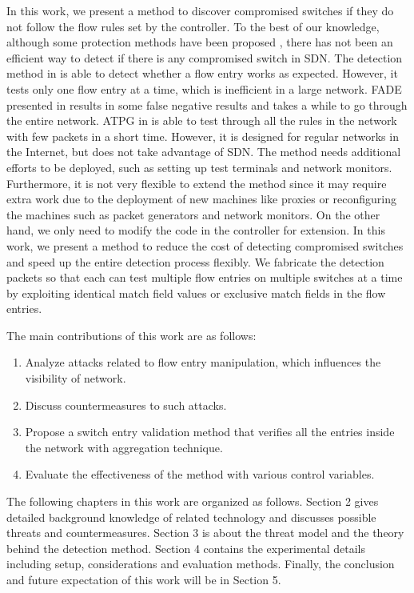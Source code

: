 \documentclass[conference]{IEEEtran}
\begin{document}
In this work, we present a method to discover compromised switches if they do not follow the flow rules set by the controller. To the best of our knowledge, although some protection methods have been proposed \cite{CKGL15,PJL16}, there has not been an efficient way to detect if there is any compromised switch in SDN. The detection method in \cite{CKGL15} is able to detect whether a flow entry works as expected. However, it tests only one flow entry at a time, which is inefficient in a large network. FADE presented in \cite{PJL16} results in some false negative results and takes a while to go through the entire network. ATPG in \cite{ZKVM12} is able to test through all the rules in the network with few packets in a short time. However, it is designed for regular networks in the Internet, but does not take advantage of SDN. The method needs additional efforts to be deployed, such as setting up test terminals and network monitors. Furthermore, it is not very flexible to extend the method since it may require extra work due to the deployment of new machines like proxies or reconfiguring the machines such as packet generators and network monitors. On the other hand, we only need to modify the code in the controller for extension. In this work, we present a method to reduce the cost of detecting compromised switches and speed up the entire detection process flexibly. We fabricate the detection packets so that each can test multiple flow entries on multiple switches at a time by exploiting identical match field values or exclusive match fields in the flow entries. 

The main contributions of this work are as follows:
\begin{enumerate}
\item
Analyze attacks related to flow entry manipulation, which influences the visibility of network.
\item
Discuss countermeasures to such attacks.
\item
Propose a switch entry validation method that verifies all the entries inside the network with aggregation technique.
\item
Evaluate the effectiveness of the method with various control variables.
\end{enumerate}

The following chapters in this work are organized as follows. Section 2 gives detailed background knowledge of related technology and discusses possible threats and countermeasures. Section 3 is about the threat model and the theory behind the detection method. Section 4 contains the experimental details including setup, considerations and evaluation methods. Finally, the conclusion and future expectation of this work will be in Section 5.
\end{document}
